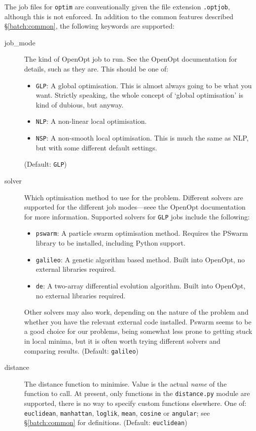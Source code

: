 \documentclass[a4paper,11pt]{article}
\begin{document}
The job files for \texttt{optim} are conventionally given the file extension \texttt{.optjob}, although this is not enforced. In addition to the common features described \S\ref{batch:common}, the following keywords are supported:
\begin{adjustwidth}{0.8cm}{0.8cm}
\begin{description}
\item[job\_mode] The kind of OpenOpt job to run. See the OpenOpt documentation for details, such as they are. This should be one of:
	\begin{itemize}
	\item \texttt{GLP}: A global optimisation. This is almost always going to be what you want. Strictly speaking, the whole concept of `global optimisation' is kind of dubious, but anyway.
	\item \texttt{NLP}: A non-linear local optimisation.
	\item \texttt{NSP}: A non-smooth local optimisation. This is much the same as NLP, but with some different default settings.
	\end{itemize}
(Default: \texttt{GLP})
\item[solver] Which optimisation method to use for the problem. Different solvers are supported for the different job modes---seee the OpenOpt documentation for more information. Supported solvers for \texttt{GLP} jobs include the following:
	\begin{itemize}
	\item \texttt{pswarm}: A particle swarm optimisation method. Requires the PSwarm library to be installed, including Python support.
	\item \texttt{galileo}: A genetic algorithm based method. Built into OpenOpt, no external libraries required.
	\item \texttt{de}: A two-array differential evolution algorithm. Built into OpenOpt, no external libraries required.
	\end{itemize}
Other solvers may also work, depending on the nature of the problem and whether you have the relevant external code installed. Pswarm seems to be a good choice for our problems, being somewhat less prone to getting stuck in local minima, but it is often worth trying different solvers and comparing results. (Default: \texttt{galileo})
\item[distance] The distance function to minimise. Value is the actual \textit{name} of the function to call. At present, only functions in the \texttt{distance.py} module are supported, there is no way to specify custom functions elsewhere. One of: \texttt{euclidean}, \texttt{manhattan}, \texttt{loglik}, \texttt{mean}, \texttt{cosine} or \texttt{angular}; see \S\ref{batch:common} for definitions. (Default: \texttt{euclidean})

\end{description}
\end{adjustwidth}
\end{document}
